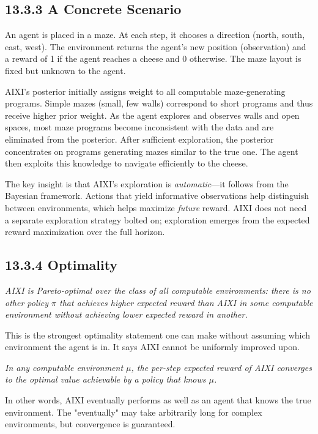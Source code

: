 \subsection{13.3.3 A Concrete Scenario}

\begin{example}
An agent is placed in a maze. At each step, it chooses a direction (north, south, east, west). The environment returns the agent's new position (observation) and a reward of 1 if the agent reaches a cheese and 0 otherwise. The maze layout is fixed but unknown to the agent.

AIXI's posterior initially assigns weight to all computable maze-generating programs. Simple mazes (small, few walls) correspond to short programs and thus receive higher prior weight. As the agent explores and observes walls and open spaces, most maze programs become inconsistent with the data and are eliminated from the posterior. After sufficient exploration, the posterior concentrates on programs generating mazes similar to the true one. The agent then exploits this knowledge to navigate efficiently to the cheese.

The key insight is that AIXI's exploration is \textit{automatic}---it follows from the Bayesian framework. Actions that yield informative observations help distinguish between environments, which helps maximize \textit{future} reward. AIXI does not need a separate exploration strategy bolted on; exploration emerges from the expected reward maximization over the full horizon.
\end{example}

\subsection{13.3.4 Optimality}

\begin{theorem}
\textit{AIXI is Pareto-optimal over the class of all computable environments: there is no other policy $\pi$ that achieves higher expected reward than AIXI in some computable environment without achieving lower expected reward in another.}

This is the strongest optimality statement one can make without assuming which environment the agent is in. It says AIXI cannot be uniformly improved upon.
\end{theorem}

\begin{theorem}
\textit{In any computable environment $\mu$, the per-step expected reward of AIXI converges to the optimal value achievable by a policy that knows $\mu$.}

In other words, AIXI eventually performs as well as an agent that knows the true environment. The "eventually" may take arbitrarily long for complex environments, but convergence is guaranteed.
\end{theorem}

